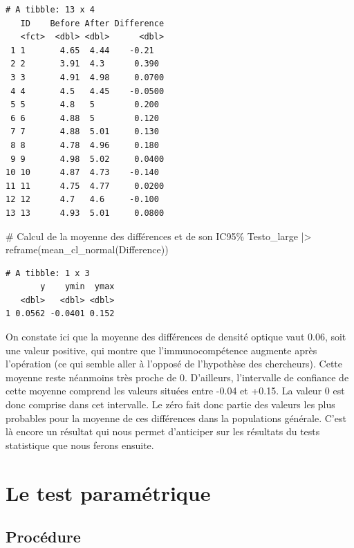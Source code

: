 \documentclass[
  french,
  a4paper,
  DIV=11,
  numbers=noendperiod,
  oneside]{scrreprt}
\newenvironment{Shaded}{}{}
\newcommand{\CommentTok}[1]{\textcolor[rgb]{0.42,0.45,0.49}{#1}}
\newcommand{\FunctionTok}[1]{\textcolor[rgb]{0.44,0.26,0.76}{#1}}
\newcommand{\NormalTok}[1]{\textcolor[rgb]{0.14,0.16,0.18}{#1}}
\newcommand{\SpecialCharTok}[1]{\textcolor[rgb]{0.00,0.36,0.77}{#1}}
\begin{document}
\begin{verbatim}
# A tibble: 13 x 4
   ID    Before After Difference
   <fct>  <dbl> <dbl>      <dbl>
 1 1       4.65  4.44    -0.21  
 2 2       3.91  4.3      0.390 
 3 3       4.91  4.98     0.0700
 4 4       4.5   4.45    -0.0500
 5 5       4.8   5        0.200 
 6 6       4.88  5        0.120 
 7 7       4.88  5.01     0.130 
 8 8       4.78  4.96     0.180 
 9 9       4.98  5.02     0.0400
10 10      4.87  4.73    -0.140 
11 11      4.75  4.77     0.0200
12 12      4.7   4.6     -0.100 
13 13      4.93  5.01     0.0800
\end{verbatim}

\begin{Shaded}
\begin{Highlighting}[]
\CommentTok{\# Calcul de la moyenne des différences et de son IC95\%}
\NormalTok{Testo\_large }\SpecialCharTok{|\textgreater{}} 
  \FunctionTok{reframe}\NormalTok{(}\FunctionTok{mean\_cl\_normal}\NormalTok{(Difference))}
\end{Highlighting}
\end{Shaded}

\begin{verbatim}
# A tibble: 1 x 3
       y    ymin  ymax
   <dbl>   <dbl> <dbl>
1 0.0562 -0.0401 0.152
\end{verbatim}

On constate ici que la moyenne des différences de densité optique vaut
0.06, soit une valeur positive, qui montre que l'immunocompétence
augmente après l'opération (ce qui semble aller à l'opposé de
l'hypothèse des chercheurs). Cette moyenne reste néanmoins très proche
de 0. D'ailleurs, l'intervalle de confiance de cette moyenne comprend
les valeurs situées entre -0.04 et +0.15. La valeur 0 est donc comprise
dans cet intervalle. Le zéro fait donc partie des valeurs les plus
probables pour la moyenne de ces différences dans la populations
générale. C'est là encore un résultat qui nous permet d'anticiper sur
les résultats du tests statistique que nous ferons ensuite.

\section{Le test paramétrique}\label{le-test-paramuxe9trique-1}

\subsection{Procédure}\label{procuxe9dure}
\end{document}

